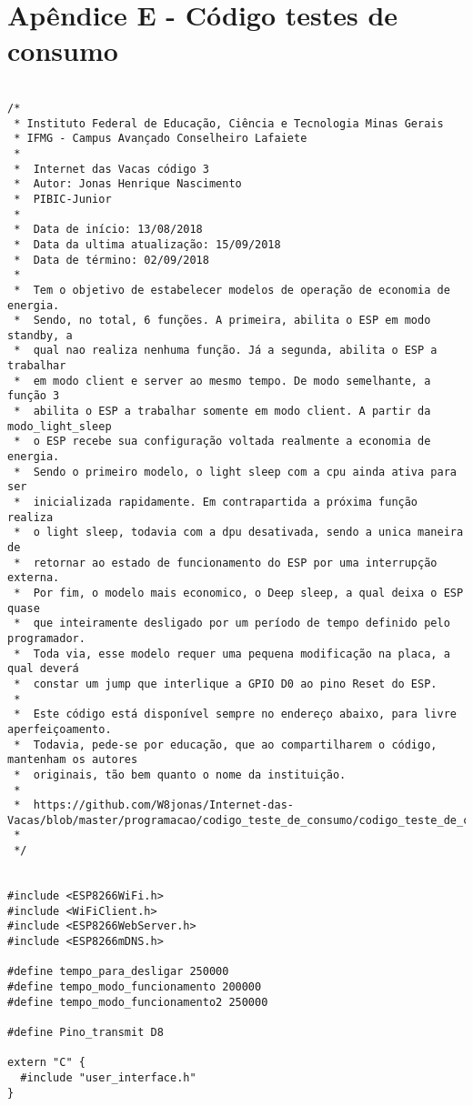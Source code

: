 \newpage
\section{Apêndice E - Código testes de consumo}
\label{sc:apendice_e_}

\begin{lstlisting}

/*
 * Instituto Federal de Educação, Ciência e Tecnologia Minas Gerais
 * IFMG - Campus Avançado Conselheiro Lafaiete 
 * 
 *  Internet das Vacas código 3
 *  Autor: Jonas Henrique Nascimento
 *  PIBIC-Junior
 * 
 *  Data de início: 13/08/2018
 *  Data da ultima atualização: 15/09/2018
 *  Data de término: 02/09/2018
 *  
 *  Tem o objetivo de estabelecer modelos de operação de economia de energia.
 *  Sendo, no total, 6 funções. A primeira, abilita o ESP em modo standby, a 
 *  qual nao realiza nenhuma função. Já a segunda, abilita o ESP a trabalhar
 *  em modo client e server ao mesmo tempo. De modo semelhante, a função 3
 *  abilita o ESP a trabalhar somente em modo client. A partir da modo_light_sleep
 *  o ESP recebe sua configuração voltada realmente a economia de energia. 
 *  Sendo o primeiro modelo, o light sleep com a cpu ainda ativa para ser 
 *  inicializada rapidamente. Em contrapartida a próxima função realiza
 *  o light sleep, todavia com a dpu desativada, sendo a unica maneira de
 *  retornar ao estado de funcionamento do ESP por uma interrupção externa.
 *  Por fim, o modelo mais economico, o Deep sleep, a qual deixa o ESP quase
 *  que inteiramente desligado por um período de tempo definido pelo programador.
 *  Toda via, esse modelo requer uma pequena modificação na placa, a qual deverá
 *  constar um jump que interlique a GPIO D0 ao pino Reset do ESP.
 * 
 *  Este código está disponível sempre no endereço abaixo, para livre aperfeiçoamento. 
 *  Todavia, pede-se por educação, que ao compartilharem o código, mantenham os autores
 *  originais, tão bem quanto o nome da instituição.
 *  
 *  https://github.com/W8jonas/Internet-das-Vacas/blob/master/programacao/codigo_teste_de_consumo/codigo_teste_de_consumo.ino
 *  
 */


#include <ESP8266WiFi.h>
#include <WiFiClient.h>
#include <ESP8266WebServer.h>
#include <ESP8266mDNS.h>

#define tempo_para_desligar 250000
#define tempo_modo_funcionamento 200000
#define tempo_modo_funcionamento2 250000

#define Pino_transmit D8

extern "C" {
  #include "user_interface.h"
}


\end{lstlisting}
